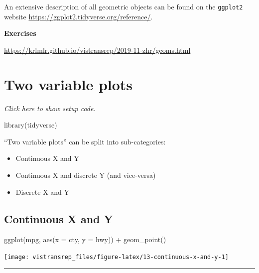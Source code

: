 \documentclass[]{book}
\newenvironment{Shaded}{}{}
\newcommand{\DataTypeTok}[1]{#1}
\newcommand{\KeywordTok}[1]{\textcolor[rgb]{0.00,0.00,1.00}{#1}}
\newcommand{\NormalTok}[1]{#1}
\newcommand{\OperatorTok}[1]{#1}
\newcommand{\StringTok}[1]{\textcolor[rgb]{0.00,0.50,0.50}{#1}}
\begin{document}
An extensive description of all geometric objects can be found on the \texttt{ggplot2} website \url{https://ggplot2.tidyverse.org/reference/}.

\textbf{Exercises}

\url{https://krlmlr.github.io/vistransrep/2019-11-zhr/geoms.html}

\hypertarget{two-variable-plots}{%
\section{Two variable plots}\label{two-variable-plots}}

\emph{Click here to show setup code.}

\begin{Shaded}
\begin{Highlighting}[]
\KeywordTok{library}\NormalTok{(tidyverse)}
\end{Highlighting}
\end{Shaded}

``Two variable plots'' can be split into sub-categories:

\begin{itemize}
\item
  Continuous X and Y
\item
  Continuous X and discrete Y (and vice-versa)
\item
  Discrete X and Y
\end{itemize}

\hypertarget{continuous-x-and-y}{%
\subsection{Continuous X and Y}\label{continuous-x-and-y}}

\begin{Shaded}
\begin{Highlighting}[]
\KeywordTok{ggplot}\NormalTok{(mpg, }\KeywordTok{aes}\NormalTok{(}\DataTypeTok{x =}\NormalTok{ cty, }\DataTypeTok{y =}\NormalTok{ hwy)) }\OperatorTok{+}
\StringTok{  }\KeywordTok{geom_point}\NormalTok{()}
\end{Highlighting}
\end{Shaded}

\begin{flushright}\texttt{[image: vistransrep\_files/figure-latex/13-continuous-x-and-y-1]} \end{flushright}

\begin{center}\rule{0.5\linewidth}{\linethickness}\end{center}
\end{document}
